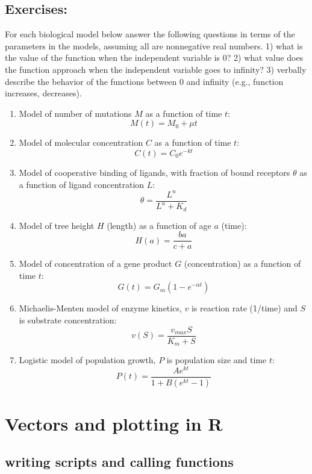 \documentclass[
  letterpaper,
  DIV=11,
  numbers=noendperiod]{scrreprt}
\begin{document}
\hypertarget{exercises-3}{%
\subsection{Exercises:}\label{exercises-3}}

For each biological model below answer the following questions in terms
of the parameters in the models, assuming all are nonnegative real
numbers. 1) what is the value of the function when the independent
variable is 0? 2) what value does the function approach when the
independent variable goes to infinity? 3) verbally describe the behavior
of the functions between 0 and infinity (e.g., function increases,
decreases).

\begin{enumerate}
\def\labelenumi{\arabic{enumi}.}
\item
  Model of number of mutations \(M\) as a function of time \(t\):
  \[ M(t) = M_0 + \mu t\]
\item
  Model of molecular concentration \(C\) as a function of time \(t\):
  \[ C(t) = C_0 e^{-kt} \]
\item
  Model of cooperative binding of
  ligands, with fraction of bound
  receptors \(\theta\) as a function of ligand concentration \(L\):
  \[ \theta = \frac{L^n}{L^n + K_d}\]
\item
  Model of tree height \(H\) (length) as a function of age \(a\) (time):
  \[ H(a) = \frac{b a }{c + a}\]
\item
  Model of concentration of a gene product \(G\) (concentration) as a
  function of time \(t\): \[ G(t) = G_m (1 - e^{-\alpha t})\]
\item
  Michaelis-Menten model  of enzyme
  kinetics, \(v\) is reaction rate (1/time) and \(S\) is substrate
  concentration: \[ v(S) = \frac{v_{max} S}{K_m + S}\]
\item
  Logistic model of population growth, \(P\) is
  population size and time \(t\):
  \[ P(t) = \frac{A e^{kt}}{1 + B(e^{kt} -1)} \]
\end{enumerate}

\hypertarget{vectors-and-plotting-in-r}{%
\section{Vectors and plotting in R}\label{vectors-and-plotting-in-r}}

\label{sec:comp2}

\hypertarget{writing-scripts-and-calling-functions}{%
\subsection{writing scripts and calling
functions}\label{writing-scripts-and-calling-functions}}
\end{document}
